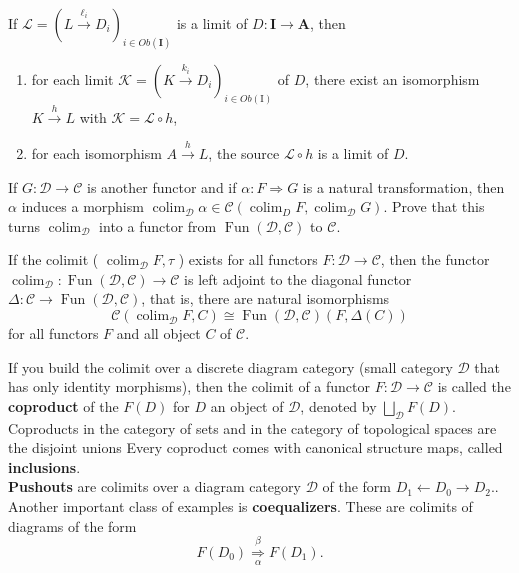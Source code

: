 \begin{prop}
If $\mathcal{L}=\left(L \xrightarrow{\ell_i} D_i\right)_{i \in O b(\mathbf{I})}$ is a limit of $D: \mathbf{I} \rightarrow \mathbf{A}$, then
    \begin{enumerate}
        \item for each limit $\mathcal{K}=\left(K \xrightarrow{k_i} D_i\right)_{i \in O b(\mathrm{I})}$ of $D$, there exist an isomorphism $K \xrightarrow{h} L$ with $\mathcal{K}=\mathcal{L} \circ h$,
        \item for each isomorphism $A \xrightarrow{h} L$, the source $\mathcal{L} \circ h$ is a limit of $D$.
    \end{enumerate}
\end{prop}


\begin{prop}
If $G: \mathcal{D} \rightarrow \mathcal{C}$ is another functor and if $\alpha: F \Rightarrow G$ is a natural transformation, then $\alpha$ induces a morphism $\operatorname{colim}_{\mathcal{D}} \alpha \in \mathcal{C}\left(\operatorname{colim}_D F, \operatorname{colim}_{\mathcal{D}} G\right)$. Prove that this turns $\operatorname{colim}_{\mathcal{D}}$ into a functor from $\operatorname{Fun}(\mathcal{D}, \mathcal{C})$ to $\mathcal{C}$.    
\end{prop}

\begin{prop}
If the colimit ( $\operatorname{colim}_{\mathcal{D}} F, \tau$ ) exists for all functors $F: \mathcal{D} \rightarrow \mathcal{C}$, then the functor $\operatorname{colim}_{\mathcal{D}}: \operatorname{Fun}(\mathcal{D}, \mathcal{C}) \rightarrow \mathcal{C}$ is left adjoint to the diagonal functor $\Delta: \mathcal{C} \rightarrow \operatorname{Fun}(\mathcal{D}, \mathcal{C})$, that is, there are natural isomorphisms
$$
\mathcal{C}\left(\operatorname{colim}_{\mathcal{D}} F, C\right) \cong \operatorname{Fun}(\mathcal{D}, \mathcal{C})(F, \Delta(C))
$$
for all functors $F$ and all object $C$ of $\mathcal{C}$.
\end{prop}


If you build the colimit over a discrete diagram category (small category $\mathcal{D}$ that has only identity morphisms), then the colimit of a functor $F: \mathcal{D} \rightarrow \mathcal{C}$ is called the \textbf{coproduct} of the $F(D)$ for $D$ an object of $\mathcal{D}$, denoted by
        $
        \bigsqcup_{\mathcal{D}} F(D) .
        $
        Coproducts in the category of sets and in the category of topological spaces are the disjoint unions
        Every coproduct comes with canonical structure maps, called \textbf{inclusions}.\\
\textbf{Pushouts} are colimits over a diagram category $\mathcal{D}$ of the form
        $
        D_1 \leftarrow D_0 \rightarrow D_2 .
        $.\\
Another important class of examples is \textbf{coequalizers}. These are colimits of diagrams of the form
        $$
        F\left(D_0\right) \underset{\alpha}{\stackrel{\beta}{\Longrightarrow}} F\left(D_1\right) .
        $$


